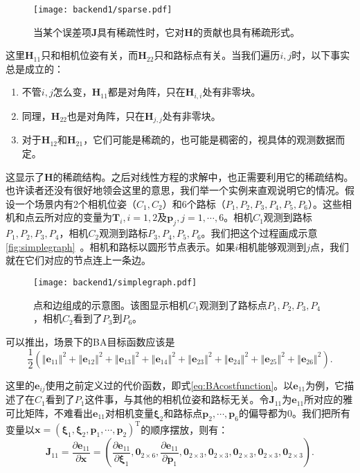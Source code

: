 \begin{figure}[!htp]
	\centering
	\texttt{[image: backend1/sparse.pdf]}
	\caption{当某个误差项$\bm{J}$具有稀疏性时，它对$\bm{H}$的贡献也具有稀疏形式。}
	\label{fig:sparse}
\end{figure}

这里$\bm{H}_{11}$只和相机位姿有关，而$\bm{H}_{22}$只和路标点有关。当我们遍历$i,j$时，以下事实总是成立的：
\begin{enumerate}
	\item 不管$i,j$怎么变，$\bm{H}_{11}$都是对角阵，只在$\bm{H}_{i,i}$处有非零块。
	\item 同理，$\bm{H}_{22}$也是对角阵，只在$\bm{H}_{j,j}$处有非零块。
	\item 对于$\bm{H}_{12}$和$\bm{H}_{21}$，它们可能是稀疏的，也可能是稠密的，视具体的观测数据而定。
\end{enumerate}

这显示了$\bm{H}$的稀疏结构。之后对线性方程的求解中，也正需要利用它的稀疏结构。也许读者还没有很好地领会这里的意思，我们举一个实例来直观说明它的情况。假设一个场景内有2个相机位姿（$C_1,C_2$）和6个路标（$P_1,P_2,P_3,P_4,P_5,P_6$）。这些相机和点云所对应的变量为$\bm{T}_i, i = 1,2$及$\bm{p}_j, j = 1,\cdots, 6$。相机$C_1$观测到路标$P_1,P_2,P_3,P_4$，相机$C_2$观测到路标$P_3,P_4,P_5,P_6$。我们把这个过程画成示意\autoref{fig:simplegraph}~。相机和路标以圆形节点表示。如果$i$相机能够观测到$j$点，我们就在它们对应的节点连上一条边。

\begin{figure}[!htp]
	\centering
	\texttt{[image: backend1/simplegraph.pdf]}
	\caption{点和边组成的示意图。该图显示相机$C_1$观测到了路标点$P_1,P_2,P_3,P_4$，相机$C_2$看到了$P_3$到$P_6$。}
	\label{fig:simplegraph}
\end{figure}

可以推出，场景下的BA目标函数应该是
\begin{equation}
\frac{1}{2}\left( \left\Vert \bm{e}_{11} \right\Vert^2 + 
\left\Vert \bm{e}_{12} \right\Vert^2 + 
\left\Vert \bm{e}_{13} \right\Vert^2 + 
\left\Vert \bm{e}_{14} \right\Vert^2 + 
\left\Vert \bm{e}_{23} \right\Vert^2 + 
\left\Vert \bm{e}_{24} \right\Vert^2 + 
\left\Vert \bm{e}_{25} \right\Vert^2 + 
\left\Vert \bm{e}_{26} \right\Vert^2 
\right).
\end{equation}

这里的$\bm{e}_{ij}$使用之前定义过的代价函数，即式\eqref{eq:BAcostfunction}。以$\bm{e}_{11}$为例，它描述了在$C_1$看到了$P_1$这件事，与其他的相机位姿和路标无关。令$\bm{J}_{11}$为$\bm{e}_{11}$所对应的雅可比矩阵，不难看出$\bm{e}_{11}$对相机变量$\bm{\xi}_2$和路标点$\bm{p}_2, \cdots, \bm{p}_6$的偏导都为0。我们把所有变量以$\bm{x} = \left( \bm{\xi}_1, \bm{\xi}_2, \bm{p}_1, \cdots, \bm{p}_2 \right)^\mathrm{T}$的顺序摆放，则有：
\begin{equation}
\bm{J}_{11} = \frac{\partial \bm{e}_{11}}{\partial \bm{x}}
= \left(
\frac{\partial \bm{e}_{11}}{\partial \bm{\xi}_1},
\bm{0}_{2\times 6},
\frac{\partial \bm{e}_{11}}{\partial \bm{p}_1},
\bm{0}_{2\times 3},
\bm{0}_{2\times 3},
\bm{0}_{2\times 3},
\bm{0}_{2\times 3},
\bm{0}_{2\times 3}
\right).
\end{equation}

